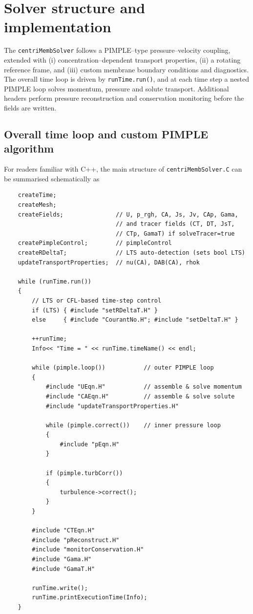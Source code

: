 \documentclass[11pt,a4paper]{article}
\begin{document}


\section{Solver structure and implementation}
\label{sec:solver-structure}

The \texttt{centriMembSolver} follows a PIMPLE--type pressure--velocity
coupling, extended with (i) concentration--dependent transport
properties, (ii) a rotating reference frame, and (iii) custom membrane
boundary conditions and diagnostics. The overall time loop is driven by
\texttt{runTime.run()}, and at each time step a nested PIMPLE loop
solves momentum, pressure and solute transport. Additional headers
perform pressure reconstruction and conservation monitoring before the
fields are written.

\subsection{Overall time loop and custom PIMPLE algorithm}

For readers familiar with C++, the main structure of
\texttt{centriMembSolver.C} can be summarised schematically as

\begin{verbatim}
	createTime;
	createMesh;
	createFields;               // U, p_rgh, CA, Js, Jv, CAp, Gama,
	                            // and tracer fields (CT, DT, JsT,
	                            // CTp, GamaT) if solveTracer=true
	createPimpleControl;        // pimpleControl
	createRDeltaT;              // LTS auto-detection (sets bool LTS)
	updateTransportProperties;  // nu(CA), DAB(CA), rhok

	while (runTime.run())
	{
		// LTS or CFL-based time-step control
		if (LTS) { #include "setRDeltaT.H" }
		else     { #include "CourantNo.H"; #include "setDeltaT.H" }

		++runTime;
		Info<< "Time = " << runTime.timeName() << endl;

		while (pimple.loop())           // outer PIMPLE loop
		{
			#include "UEqn.H"           // assemble & solve momentum
			#include "CAEqn.H"          // assemble & solve solute
			#include "updateTransportProperties.H"

			while (pimple.correct())    // inner pressure loop
			{
				#include "pEqn.H"
			}

			if (pimple.turbCorr())
			{
				turbulence->correct();
			}
		}

		#include "CTEqn.H"
		#include "pReconstruct.H"
		#include "monitorConservation.H"
		#include "Gama.H"
		#include "GamaT.H"

		runTime.write();
		runTime.printExecutionTime(Info);
	}
\end{verbatim}
\end{document}
